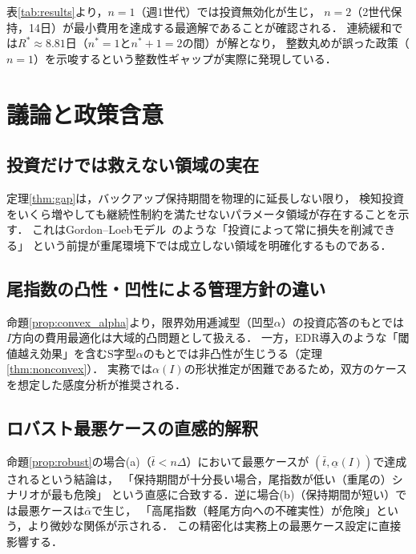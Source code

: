 \documentclass[12pt,a4paper]{article}
\theoremstyle{plain}
\theoremstyle{definition}
\theoremstyle{remark}
\begin{document}
表\ref{tab:results}より，$n=1$（週1世代）では投資無効化が生じ，
$n=2$（2世代保持，14日）が最小費用を達成する最適解であることが確認される．
連続緩和では$R^* \approx 8.81$日（$n^* = 1$と$n^*+1=2$の間）が解となり，
整数丸めが誤った政策（$n=1$）を示唆するという整数性ギャップが実際に発現している．

\section{議論と政策含意}
\label{sec:discussion}

\subsection{投資だけでは救えない領域の実在}

定理\ref{thm:gap}は，バックアップ保持期間を物理的に延長しない限り，
検知投資をいくら増やしても継続性制約を満たせないパラメータ領域が存在することを示す．
これはGordon–Loebモデル~\cite{gordon2002economics}のような「投資によって常に損失を削減できる」
という前提が重尾環境下では成立しない領域を明確化するものである．

\subsection{尾指数の凸性・凹性による管理方針の違い}

命題\ref{prop:convex_alpha}より，限界効用逓減型（凹型$\alpha$）の投資応答のもとでは
$I$方向の費用最適化は大域的凸問題として扱える．
一方，EDR導入のような「閾値越え効果」を含むS字型$\alpha$のもとでは非凸性が生じうる（定理\ref{thm:nonconvex}）．
実務では$\alpha(I)$の形状推定が困難であるため，双方のケースを想定した感度分析が推奨される．

\subsection{ロバスト最悪ケースの直感的解釈}

命題\ref{prop:robust}の場合(a)（$\bar{t} < n\Delta$）において最悪ケースが
$(\bar{t}, \underline{\alpha}(I))$で達成されるという結論は，
「保持期間が十分長い場合，尾指数が低い（重尾の）シナリオが最も危険」
という直感に合致する．逆に場合(b)（保持期間が短い）では最悪ケースは$\bar{\alpha}$で生じ，
「高尾指数（軽尾方向への不確実性）が危険」という，より微妙な関係が示される．
この精密化は実務上の最悪ケース設定に直接影響する．
\end{document}
